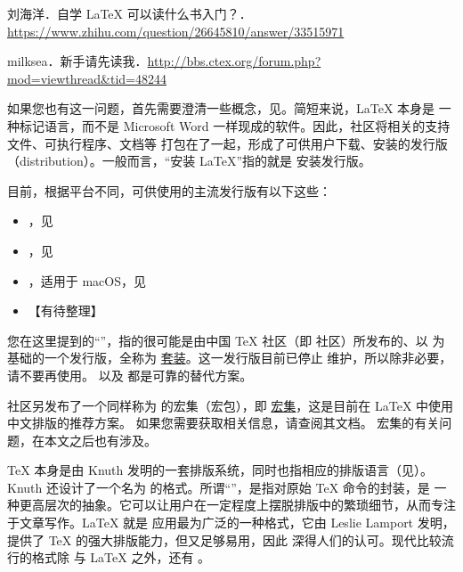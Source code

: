 \begin{reference}
  \item 刘海洋．自学 \LaTeX{} 可以读什么书入门？．
    \url{https://www.zhihu.com/question/26645810/answer/33515971}
  \item milksea．新手请先读我．\url{http://bbs.ctex.org/forum.php?mod=viewthread&tid=48244}
\end{reference}



如果您也有这一问题，首先需要澄清一些概念，见。简短来说，\LaTeX{} 本身是
一种标记语言，而不是 Microsoft Word 一样现成的软件。因此，社区将相关的支持文件、可执行程序、文档等
打包在了一起，形成了可供用户下载、安装的发行版（distribution）。一般而言，“安装 \LaTeX{}”指的就是
安装发行版。

目前，根据平台不同，可供使用的主流发行版有以下这些：

\begin{itemize}
  \item \TeXLive{}，见
  \item \MiKTeX{}，见
  \item \MacTeX{}，适用于 macOS，见
  \item 【有待整理】
\end{itemize}



您在这里提到的“\CTeX{}”，指的很可能是由中国 \TeX{} 社区（即 \CTeX{} 社区）所发布的、以 \MiKTeX{}
为基础的一个发行版，全称为 \href{http://www.ctex.org/CTeX}{\CTeX{} 套装}。这一发行版目前已停止
维护，所以除非必要，请不要再使用。\TeXLive{} 以及 \MiKTeX{} 都是可靠的替代方案。

\CTeX{} 社区另发布了一个同样称为 \CTeX{} 的宏集（宏包），即
\href{https://www.ctan.org/pkg/ctex}{\CTeX{} 宏集}，这是目前在 \LaTeX{} 中使用中文排版的推荐方案。
如果您需要获取相关信息，请查阅其文档。\CTeX{} 宏集的有关问题，在本文之后也有涉及。



\TeX{} 本身是由 Knuth 发明的一套排版系统，同时也指相应的排版语言（见）。
Knuth 还设计了一个名为 \PlainTeX{} 的格式。所谓“”，是指对原始 \TeX{} 命令的封装，是
一种更高层次的抽象。它可以让用户在一定程度上摆脱排版中的繁琐细节，从而专注于文章写作。\LaTeX{} 就是
应用最为广泛的一种格式，它由 Leslie Lamport 发明，提供了 \TeX{} 的强大排版能力，但又足够易用，因此
深得人们的认可。现代比较流行的格式除 \PlainTeX{} 与 \LaTeX{} 之外，还有 \ConTeXt{}。

